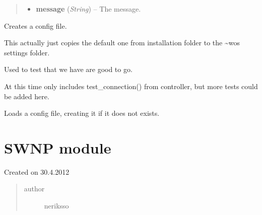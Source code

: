 \documentclass[letterpaper,10pt,english]{sphinxmanual}
\begin{document}
\begin{fulllineitems}
\begin{fulllineitems}
\begin{quote}
\begin{description}
\begin{itemize}
\item {} 
\textbf{message} (\emph{String}) -- The message.

\end{itemize}

\end{description}\end{quote}

\end{fulllineitems}


\end{fulllineitems}


\begin{fulllineitems}
\label{state:state.create_config}
Creates a config file.

This actually just copies the default one from installation folder
to the \textasciitilde{}wos settings folder.

\end{fulllineitems}


\begin{fulllineitems}
\label{state:state.initialization_test}
Used to test that we have are good to go.

At this time only includes test\_connection() from controller, but
more tests could be added here.

\end{fulllineitems}


\begin{fulllineitems}
\label{state:state.load_config}
Loads a config file, creating it if it does not exists.

\end{fulllineitems}



\section{SWNP module}
\label{swnp::doc}\label{swnp:swnp-module}\label{swnp:module-swnp}
Created on 30.4.2012
\begin{quote}\begin{description}
\item[{author}] \leavevmode
neriksso

\end{description}\end{quote}
\end{document}
